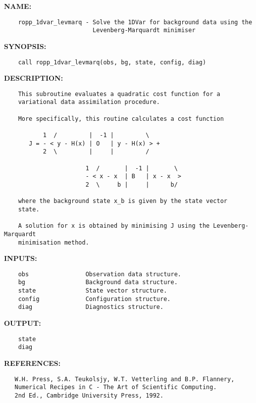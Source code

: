 \label{ch:robo2}
\label{ch:1DVar_ropp_1dvar_levmarq}
\textbf{NAME:}\hspace{0.08in}\begin{Verbatim}
    ropp_1dvar_levmarq - Solve the 1DVar for background data using the
                         Levenberg-Marquardt minimiser
\end{Verbatim}
\textbf{SYNOPSIS:}\hspace{0.08in}\begin{Verbatim}
    call ropp_1dvar_levmarq(obs, bg, state, config, diag)
\end{Verbatim}
\textbf{DESCRIPTION:}\hspace{0.08in}\begin{Verbatim}
    This subroutine evaluates a quadratic cost function for a
    variational data assimilation procedure. 

    More specifically, this routine calculates a cost function

           1  /         |  -1 |         \
       J = - < y - H(x) | O   | y - H(x) > + 
           2  \         |     |         /

                       1  /       |  -1 |       \
                       - < x - x  | B   | x - x  >
                       2  \     b |     |      b/

    where the background state x_b is given by the state vector
    state. 

    A solution for x is obtained by minimising J using the Levenberg-Marquardt
    minimisation method.
\end{Verbatim}
\textbf{INPUTS:}\hspace{0.08in}\begin{Verbatim}
    obs                Observation data structure.
    bg                 Background data structure.
    state              State vector structure.
    config             Configuration structure.
    diag               Diagnostics structure.
\end{Verbatim}
\textbf{OUTPUT:}\hspace{0.08in}\begin{Verbatim}
    state 
    diag
\end{Verbatim}
\textbf{REFERENCES:}\hspace{0.08in}\begin{Verbatim}
   W.H. Press, S.A. Teukolsjy, W.T. Vetterling and B.P. Flannery,
   Numerical Recipes in C - The Art of Scientific Computing.
   2nd Ed., Cambridge University Press, 1992.
\end{Verbatim}
